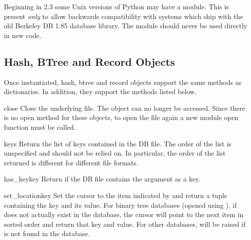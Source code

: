 \begin{seealso}
\end{seealso}

\begin{notice}
Beginning in 2.3 some Unix versions of Python may have a 
module.  This is present \emph{only} to allow backwards compatibility with
systems which ship with the old Berkeley DB 1.85 database library.  The
 module should never be used directly in new code.
\end{notice}

\subsection{Hash, BTree and Record Objects \label{bsddb-objects}}

Once instantiated, hash, btree and record objects support
the same methods as dictionaries.  In addition, they support
the methods listed below.

\begin{methoddesc}{close}{}
Close the underlying file.  The object can no longer be accessed.  Since
there is no open  method for these objects, to open the file
again a new  module open function must be called.
\end{methoddesc}

\begin{methoddesc}{keys}{}
Return the list of keys contained in the DB file.  The order of the list is
unspecified and should not be relied on.  In particular, the order of the
list returned is different for different file formats.
\end{methoddesc}

\begin{methoddesc}{has_key}{key}
Return  if the DB file contains the argument as a key.
\end{methoddesc}

\begin{methoddesc}{set_location}{key}
Set the cursor to the item indicated by  and return a tuple
containing the key and its value.  For binary tree databases (opened
using ), if  does not actually exist in
the database, the cursor will point to the next item in sorted order
and return that key and value.  For other databases,
 will be raised if  is not found in the
database.
\end{methoddesc}

